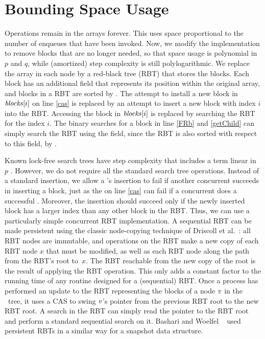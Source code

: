 
\section{Bounding Space Usage}
\label{reducing}

Operations remain in the  arrays forever. 
This uses space proportional to the number of enqueues that have been invoked.
Now, we modify the implementation to remove blocks that are no longer needed, so that space usage is
polynomial in $p$ and $q$, while (amortized) step complexity is still polylogarithmic. We replace the  array in each node by a red-black tree (RBT)
that stores the blocks.
Each block has an additional  field
that represents its position within the original  array, and
blocks in a RBT are sorted by .
The attempt to install a new block in $\mbox{\textit{blocks}}[i]$  on line \ref{cas}
is replaced by an attempt to insert a new block with index $i$ into the RBT.
Accessing the block in $\mbox{\textit{blocks}}[i]$ is 
replaced by searching the RBT for the  index $i$.
The binary searches for a block in line \ref{FRb} and \ref{getChild} can simply search the RBT
using the  field, since the RBT is also sorted with respect to this field, by .
 
Known lock-free search trees have step complexity that includes a term linear in $p$ \cite{EFHR14,Ko20}.  
However, we do not require all the standard search tree operations.
Instead of a standard insertion, we allow a 's insertion to fail if another
concurrent  succeeds in inserting a block, just as the  on line \ref{cas}
can fail if a concurrent  does a successful .
Moreover, the insertion should succeed only if the newly inserted block has a larger index than any other block in the RBT.
Thus, we can use a particularly simple concurrent RBT implementation.
A sequential RBT can be made persistent using the classic node-copying technique of 
Driscoll et al.~\cite{DSST89}:  all RBT nodes are immutable, and operations on the 
RBT make a new copy of each RBT node $x$ that must be modified, as well
as each RBT node along the path from the RBT's root to~$x$.
The RBT reachable from the new copy of the root is the result of applying the RBT operation.
This only adds a constant factor to the running time of any routine designed for a (sequential) RBT.
Once a process has performed an update to the RBT representing the blocks of a node 
$\mbox{\textnormal{\textit{v}}}$ in the \ordering\ tree, 
it uses a CAS to swing $\mbox{\textnormal{\textit{v}}}$'s pointer from the previous RBT root to the new RBT root.
A search in the RBT can simply read the pointer to the RBT root and perform a standard
sequential search on it.
Bashari and Woelfel ~\cite{DBLP:conf/podc/BashariW21} used persistent RBTs in a similar way for a snapshot data structure.

